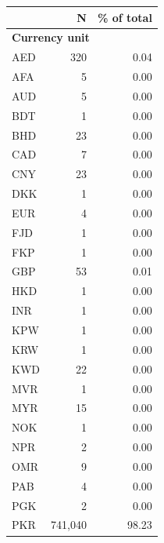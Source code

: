 \begin{tabular}{lrr}


\toprule


 & N & \% of total \\


\midrule


\multicolumn{3}{l}{\textbf{Currency unit}}\\ 
\midrule
AED                 &         320&        0.04\\
AFA                 &           5&        0.00\\
AUD                 &           5&        0.00\\
BDT                 &           1&        0.00\\
BHD                 &          23&        0.00\\
CAD                 &           7&        0.00\\
CNY                 &          23&        0.00\\
DKK                 &           1&        0.00\\
EUR                 &           4&        0.00\\
FJD                 &           1&        0.00\\
FKP                 &           1&        0.00\\
GBP                 &          53&        0.01\\
HKD                 &           1&        0.00\\
INR                 &           1&        0.00\\
KPW                 &           1&        0.00\\
KRW                 &           1&        0.00\\
KWD                 &          22&        0.00\\
MVR                 &           1&        0.00\\
MYR                 &          15&        0.00\\
NOK                 &           1&        0.00\\
NPR                 &           2&        0.00\\
OMR                 &           9&        0.00\\
PAB                 &           4&        0.00\\
PGK                 &           2&        0.00\\
PKR                 &     741,040&       98.23\\

\end{tabular}
